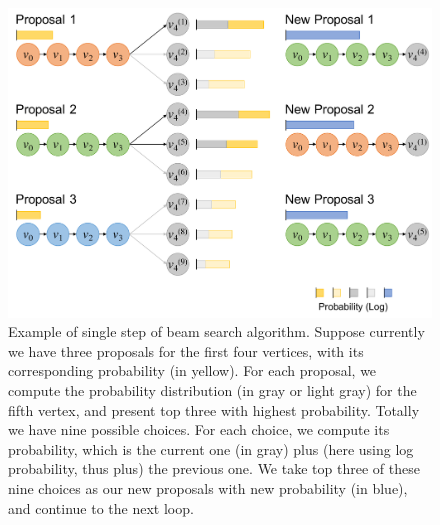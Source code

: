 \begin{figure}[!h]
	\centering
	\includegraphics[width=\fig\textwidth]{3-19.pdf}
    \caption[Example of single step of beam search algorithm]{Example of single step of beam search algorithm. Suppose currently we have three proposals for the first four vertices, with its corresponding probability (in yellow). For each proposal, we compute the probability distribution (in gray or light gray) for the fifth vertex, and present top three with highest probability. Totally we have nine possible choices. For each choice, we compute its probability, which is the current one (in gray) plus (here using log probability, thus plus) the previous one. We take top three of these nine choices as our new proposals with new probability (in blue), and continue to the next loop.}
	\label{fig:bmsrch}
\end{figure}

